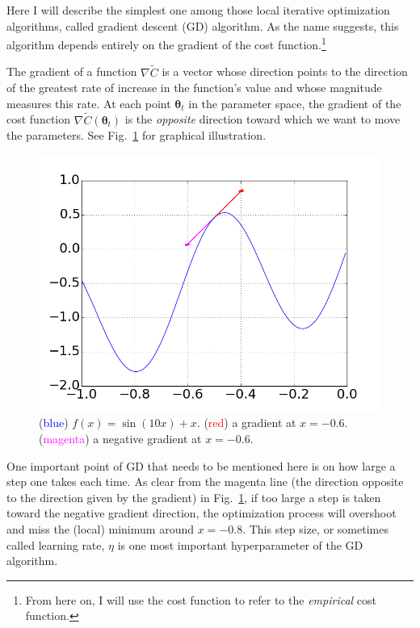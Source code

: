 \documentclass{report}
\newcommand{\vects}[1]{\boldsymbol{#1}}
\newcommand{\TT}[0]{\vects{\theta}}
\begin{document}
Here I will describe the simplest one among those local iterative optimization
algorithms, called gradient descent (GD) algorithm. As the name suggests, this
algorithm depends entirely on the gradient of the cost function.\footnote{
    From here on, I will use the cost function to refer to the {\em empirical}
    cost function.
} 

The gradient of a function $\nabla \tilde{C}$ is a vector whose direction points
to the direction of the greatest rate of increase in the function's value and
whose magnitude measures this rate. At each point $\TT_t$ in the parameter
space, the gradient of the cost function $\nabla \tilde{C}(\TT_t)$ is the {\em
opposite} direction toward which we want to move the parameters. See
Fig.~\ref{fig:grad} for graphical illustration.

\begin{figure}
    \centering
    \begin{minipage}{0.6\textwidth}
        \includegraphics[width=\columnwidth]{figures/grad_figure.png}
    \end{minipage}
    \hfill
    \begin{minipage}{0.39\textwidth}
        \caption{(\textcolor{blue}{blue}) $f(x) = \sin(10 x) + x$.
            (\textcolor{red}{red}) a gradient at $x=-0.6$.
        (\textcolor{magenta}{magenta}) a negative gradient at $x=-0.6$.}
        \label{fig:grad}
    \end{minipage}
\end{figure}

One important point of GD that needs to be mentioned here is on how large a step
one takes each time. As clear from the magenta line (the direction opposite to
the direction given by the gradient) in Fig.~\ref{fig:grad}, if too large a step
is taken toward the negative gradient direction, the optimization process will
overshoot and miss the (local) minimum around $x=-0.8$. This step size, or
sometimes called learning rate, $\eta$ is one most important hyperparameter of
the GD algorithm.
\end{document}
